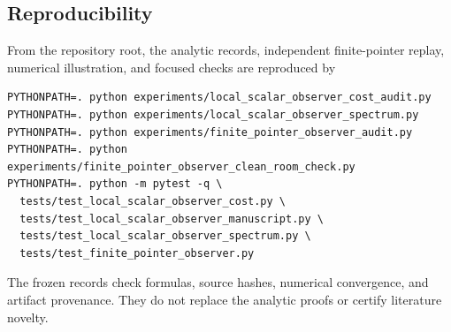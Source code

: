 \subsection{Reproducibility}

From the repository root, the analytic records, independent finite-pointer
replay, numerical illustration, and focused checks are reproduced by
\begin{verbatim}
PYTHONPATH=. python experiments/local_scalar_observer_cost_audit.py
PYTHONPATH=. python experiments/local_scalar_observer_spectrum.py
PYTHONPATH=. python experiments/finite_pointer_observer_audit.py
PYTHONPATH=. python experiments/finite_pointer_observer_clean_room_check.py
PYTHONPATH=. python -m pytest -q \
  tests/test_local_scalar_observer_cost.py \
  tests/test_local_scalar_observer_manuscript.py \
  tests/test_local_scalar_observer_spectrum.py \
  tests/test_finite_pointer_observer.py
\end{verbatim}
The frozen records check formulas, source hashes, numerical convergence, and
artifact provenance.  They do not replace the analytic proofs or certify
literature novelty.
